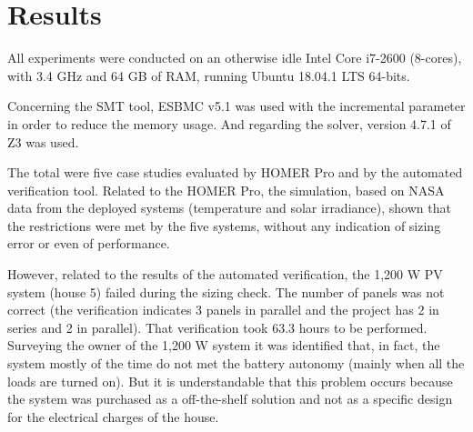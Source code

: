 \documentclass[journal]{IEEEtran}
\begin{document}

\section{Results} \label{sec:results}
%
%
%
All experiments were conducted on an otherwise idle Intel Core i7-2600 (8-cores), with 3.4 GHz and 64 GB of RAM, running Ubuntu 18.04.1 LTS 64-bits.

Concerning the SMT tool, ESBMC v5.1 was used with the incremental parameter in order to reduce the memory usage. And regarding the solver, version 4.7.1 of Z3 was used.

The total were five case studies evaluated by HOMER Pro and by the automated verification tool. Related to the HOMER Pro, the simulation, based on NASA data from the deployed systems (temperature and solar irradiance), shown that the restrictions were met by the five systems, without any indication of sizing error or even of performance.

However, related to the results of the automated verification, the 1,200 W PV system (house 5) failed during the sizing check. The number of panels was not correct (the verification indicates 3 panels in parallel and the project has 2 in series and 2 in parallel). That verification took 63.3 hours to be performed. Surveying the owner of the 1,200 W system it was identified that, in fact, the system mostly of the time do not met the battery autonomy (mainly when all the loads are turned on). But it is understandable that this problem occurs because the system was purchased as a off-the-shelf solution and not as a specific design for the electrical charges of the house.
\end{document}
